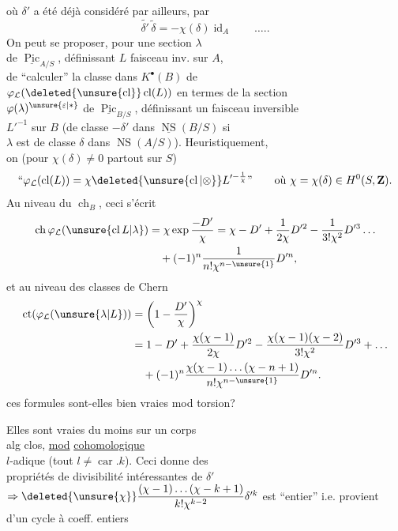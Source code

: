 où $\delta'$  a été déjà considéré par ailleurs, par
\[
\widetilde{\delta'}\,\widetilde\delta=-\chi(\delta)\operatorname{id}_A\qquad\ldots..
\]
On peut se proposer, pour une section $\lambda$\\
de $\underline{\operatorname{Pic}}_{A/S}$, définissant $L$ faisceau inv. sur $A$,\\
de ``calculer'' la classe dans $K^\bullet(B)$ de\\
$\varphi_{\mathcal L}(\deleted{\unsure{\operatorname{cl}}}\operatorname{cl}(L))$ en termes de  la section\\
$\varphi(\lambda)^{\unsure{\varepsilon|*}}$ de $\underline{\operatorname{Pic}}_{B/S}$, définissant un faisceau inversible\\
$L'^{-1}$ sur $B$ (de classe $-\delta'$ dans $\underline{\operatorname{NS}}(B/S)$ si\\
$\lambda$ est de classe $\delta$ dans $\operatorname{NS}(A/S)$). Heuristiquement,\\
on   (pour $\chi(\delta)\neq0$ partout sur $S$)
\[
\text{``}\varphi_{\mathcal L}(\operatorname{cl}(L))=\chi\deleted{\unsure{\operatorname{cl}|\otimes}}L'^{-\frac1\chi}\text{''}
\qquad\text{où }\chi=\chi(\delta)\in H^0(S,\mathbf Z).
\]
Au niveau du $\operatorname{ch}_B$, ceci s'écrit
\[
\begin{aligned}
\operatorname{ch}\varphi_{\mathcal L}(\unsure{\operatorname{cl}L|\lambda})
&=\chi\exp\frac{-D'}\chi
=\chi-D'+\frac1{2\chi}D'^2-\frac1{3!\chi^2}D'^3\ldots\\
&\quad+(-1)^n\frac1{n!\chi^{n-\unsure{1}}}D'^n,
\end{aligned}
\]
et au niveau des classes de Chern 
\[
\begin{aligned}
\operatorname{ct}(\varphi_{\mathcal L}(\unsure{\lambda|L}))&=\left(1-\frac{D'}\chi\right)^\chi\\
&=1-D'+\frac{\chi(\chi-1)}{2\chi}D'^2
-\frac{\chi(\chi-1)(\chi-2)}{3!\chi^2}D'^3+\ldots\\
&\quad+(-1)^n\frac{\chi(\chi-1)\ldots(\chi-n+1)}{n!\chi^{n-\unsure{1}}}D'^n.
\end{aligned}
\]
ces formules sont-elles bien vraies mod torsion?

Elles sont vraies du moins sur un corps\\
alg clos, \uline{mod}  \uline{cohomologique}\\
$l$-adique (tout $l\neq\operatorname{car}.k$). Ceci donne des\\
propriétés de divisibilité intéressantes de $\delta'$\\
 $\Rightarrow\deleted{\unsure{\chi}}\dfrac{(\chi-1)\ldots(\chi-k+1)}{k!\chi^{k-2}}\delta'^k$ est ``entier'' i.e. provient\\
d'un cycle à coeff. entiers
\margin{!\quad!!}
